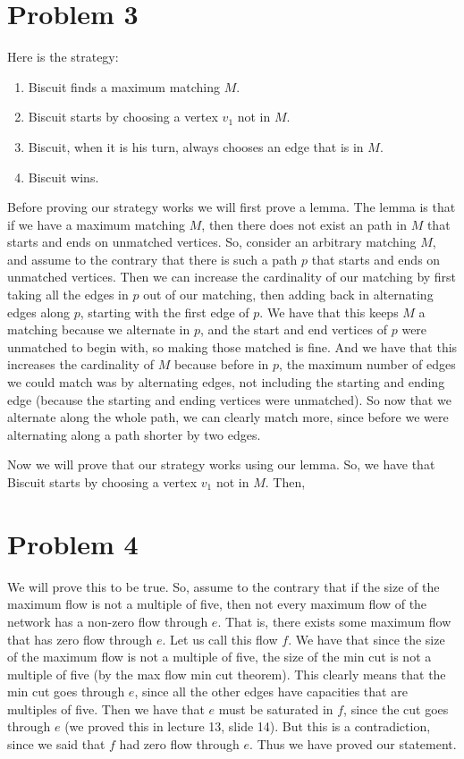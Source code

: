 \documentclass{article}
\begin{document}
\section*{Problem 3}
Here is the strategy:
\begin{enumerate}
    \item Biscuit finds a maximum matching $M$.
    \item Biscuit starts by choosing a vertex $v_1$ not in $M$.
    \item Biscuit, when it is his turn, always chooses an edge that is in $M$.
    \item Biscuit wins.
\end{enumerate}
Before proving our strategy works we will first prove a lemma. The lemma
is that if we have a maximum matching $M$, then there does not exist
an path in $M$ that starts and ends on unmatched vertices. So, consider
an arbitrary matching $M$, and assume to the contrary that there is such
a path $p$ that starts and ends on unmatched vertices. Then we can increase
the cardinality of our matching by first taking all the edges in $p$ out
of our matching, then adding back in alternating edges along $p$, starting
with the first edge of $p$. We have that this keeps $M$ a matching because
we alternate in $p$, and the start and end vertices of $p$ were unmatched
to begin with, so making those matched is fine. And we have that this
increases the cardinality of $M$ because before in $p$, the maximum number
of edges we could match was by alternating edges, not including the starting
and ending edge (because the starting and ending vertices were unmatched).
So now that we alternate along the whole path, we can clearly match more, since
before we were alternating along a path shorter by two edges.

Now we will prove that our strategy works using our lemma. So, we have that
Biscuit starts by choosing a vertex $v_1$ not in $M$. Then,


\section*{Problem 4}
We will prove this to be true. So, assume to the contrary that if the size
of the maximum flow is not a multiple of five, then not every maximum flow
of the network has a non-zero flow through $e$. That is, there exists some
maximum flow that has zero flow through $e$. Let us call this flow $f$.
We have that since the size
of the maximum flow is not a multiple of five, the size of the min cut is not
a multiple of five (by the max flow min cut theorem). This clearly means that
the min cut goes through $e$, since all the other edges have capacities that
are multiples of five. Then we have
that $e$ must be saturated in $f$, since the cut goes through $e$ (we proved this
in lecture 13, slide 14). But this is a contradiction, since we said that $f$
had zero flow through $e$. Thus we have proved our statement.
\end{document}
